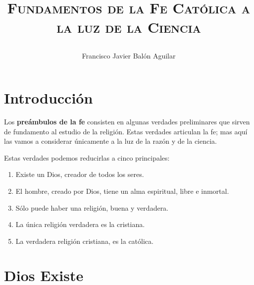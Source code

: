 \documentclass[11pt, twosides, titlepage]{article}
\title{{\scshape\Huge Fundamentos de la Fe Católica a la luz de la Ciencia \par}}
\author{Francisco Javier Balón Aguilar}
\begin{document}
\maketitle
\renewcommand{\contentsname}{Índice de contenidos} %
\tableofcontents %
\newpage

\listoffigures
\newpage

\listoftables
\newpage

\section{Introducción}

    Los \textbf{preámbulos de  la fe} consisten en algunas verdades preliminares que 
    sirven de fundamento al estudio de la religión. Estas verdades articulan la fe; 
    mas aquí las vamos a considerar únicamente a la luz de la razón y de la ciencia.

    Estas verdades podemos reducirlas a cinco principales:

    \begin{enumerate}
        \item Existe un Dios, creador de todos los seres.
        \item El hombre, creado por Dios, tiene un alma espiritual, libre e inmortal.
        \item Sólo puede haber una religión, buena y verdadera.
        \item La única religión verdadera es la cristiana.
        \item La verdadera religión cristiana, es la católica.
    \end{enumerate}

\section{Dios Existe}
\end{document}
